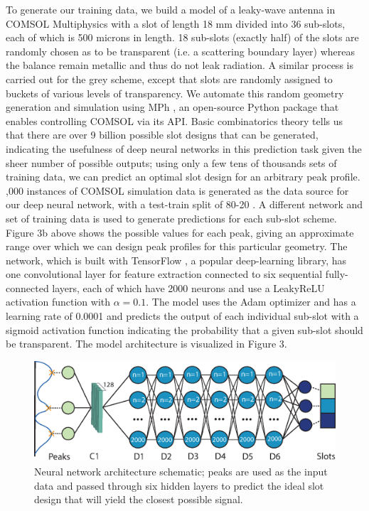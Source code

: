 \documentclass[11pt]{article}
\begin{document}
\noindent To generate our training data, we build a model of a leaky-wave antenna in COMSOL Multiphysics with a slot of length 18 mm divided into 36 sub-slots, each of which is 500 microns in length. 18 sub-slots (exactly half) of the slots are randomly chosen as to be transparent (i.e. a scattering boundary layer) whereas the balance remain metallic and thus do not leak radiation. A similar process is carried out for the grey scheme, except that slots are randomly assigned to buckets of various levels of transparency. We automate this random geometry generation and simulation using MPh \cite{john_hennig_2022_6312347}, an open-source Python package that enables controlling COMSOL via its API. Basic combinatorics theory tells us that there are over 9 billion possible slot designs that can be generated, indicating the usefulness of deep neural networks in this prediction task given the sheer number of possible outputs; using only a few tens of thousands sets of training data, we can predict an optimal slot design for an arbitrary peak profile. \\

,000 instances of COMSOL simulation data is generated as the data source for our deep neural network, with a test-train split of 80-20 \cite{molecules26041111}. A different network and set of training data is used to generate predictions for each sub-slot scheme. Figure 3b above shows the possible values for each peak, giving an approximate range over which we can design peak profiles for this particular geometry. The network, which is built with TensorFlow \cite{tensorflow2015-whitepaper}, a popular deep-learning library, has one convolutional layer for feature extraction connected to six sequential fully-connected layers, each of which have 2000 neurons and use a LeakyReLU activation function with $\alpha = 0.1$. The model uses the Adam optimizer and has a learning rate of 0.0001 and predicts the output of each individual sub-slot with a sigmoid activation function indicating the probability that a given sub-slot should be transparent. The model architecture is visualized in Figure 3. \\

\begin{figure}[H]
	\centering
	\includegraphics[width=6in]{figures/fig1.eps}
	\caption{Neural network architecture schematic; peaks are used as the input data and passed through six hidden layers to predict the ideal slot design that will yield the closest possible signal.}
\end{figure}
\end{document}
